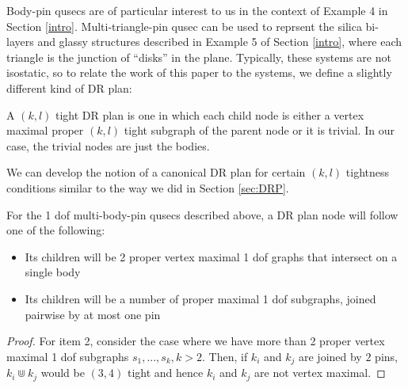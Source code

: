Body-pin qusecs are of particular interest to us in the context of Example 4 in Section \ref{intro}. Multi-triangle-pin qusec can be used to reprsent the silica bi-layers and glassy structures described in Example 5 of Section \ref{intro}, where each triangle is the junction of ``disks'' in the plane. Typically, these systems are not isostatic, so to relate the work of this paper to the systems, we define a slightly different kind of DR plan:

\begin{definition}
    A $(k,l)$ tight DR plan is one in which each child node is either a vertex maximal proper $(k,l)$ tight subgraph of the parent node or it is trivial. In our case, the trivial nodes are just the bodies.
\end{definition}

We can develop the notion of a canonical DR plan for certain $(k,l)$ tightness conditions similar to the way we did in Section \ref{sec:DRP}.

\begin{remark}
\label{rem:1dofcanon}
    For the 1 dof multi-body-pin qusecs described above, a DR plan node will follow one of the following:

    \begin{itemize}
        \item Its children will be 2 proper vertex maximal 1 dof graphs that intersect on a single body
        \item Its children will be a number of proper maximal 1 dof subgraphs, joined pairwise by at most one pin
    \end{itemize}
\end{remark}

\begin{proof}

    For item 2, consider the case where we have more than 2 proper vertex maximal 1 dof subgraphs $s_1, ..., s_k, k > 2$. Then, if $k_i$ and $k_j$ are joined by $2$ pins, $k_i \Cup k_j$ would be $(3,4)$ tight and hence $k_i$ and $k_j$ are not vertex maximal.
\end{proof}

